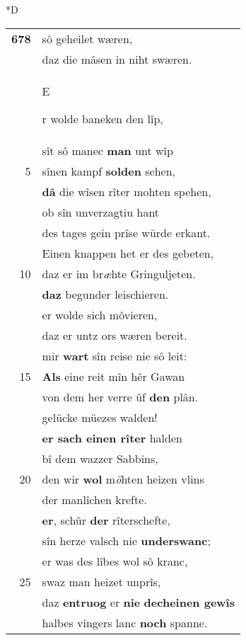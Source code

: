 \documentclass[8pt,a4paper,notitlepage]{article}
\begin{document}
\begin{table}[ht]
\begin{minipage}[t]{0.5\linewidth}
\small
\begin{center}*D
\end{center}
\begin{tabular}{rl}
\textbf{678} & sô geheilet wæren,\\ 
 & daz die mâsen in niht swæren.\\ 
 & \begin{large}E\end{large}r wolde baneken den lîp,\\ 
 & sît sô manec \textbf{man} unt wîp\\ 
5 & sînen kampf \textbf{solden} sehen,\\ 
 & \textbf{dâ} die wîsen rîter mohten spehen,\\ 
 & ob sîn unverzagtiu hant\\ 
 & des tages gein prîse würde erkant.\\ 
 & Einen knappen het er des gebeten,\\ 
10 & daz er im br\textit{æ}hte Gringuljeten.\\ 
 & \textbf{daz} begunder leischieren.\\ 
 & er wolde sich môvieren,\\ 
 & daz er untz ors wæren bereit.\\ 
 & mir \textbf{wart} sîn reise nie sô leit:\\ 
15 & \textbf{Als} eine reit mîn hêr Gawan\\ 
 & von dem her verre ûf \textbf{den} plân.\\ 
 & gelücke müezes walden!\\ 
 & \textbf{er sach einen rîter} halden\\ 
 & bî dem wazzer Sabbins,\\ 
20 & den wir \textbf{wol} m\textit{ö}hten heizen vlins\\ 
 & der manlîchen krefte.\\ 
 & \textbf{er}, schûr \textbf{der} rîterschefte,\\ 
 & sîn herze valsch nie \textbf{underswanc};\\ 
 & er was des lîbes wol sô kranc,\\ 
25 & swaz man heizet unprîs,\\ 
 & daz \textbf{en}\textbf{truog} er \textbf{nie} \textbf{decheinen gewîs}\\ 
 & halbes vingers lanc \textbf{noch} spanne.\\ 

\end{tabular}
\end{minipage}
\end{table}
\end{document}
